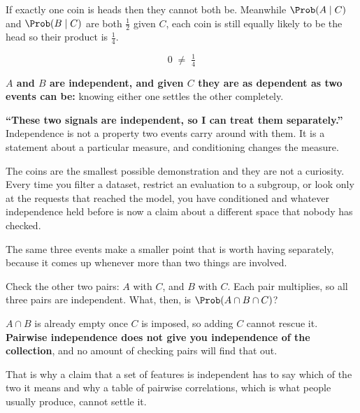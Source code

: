 \begin{fr}

If exactly one coin is heads then they cannot both be. Meanwhile
$\Prob(A \mid C)$ and $\Prob(B \mid C)$ are both $\frac{1}{2}$ \dash{} given
$C$, each coin is still equally likely to be the head \dash{} so their product
is $\frac{1}{4}$.

\[ 0 \;\ne\; \tfrac{1}{4} \]

\textbf{$A$ and $B$ are independent, and given $C$ they are as dependent as two
events can be:} knowing either one settles the other completely.
\end{fr}

\begin{fr}
\begin{trapbox}
\textbf{\enquote{These two signals are independent, so I can treat them
separately.}} Independence is not a property two events carry around with them.
It is a statement about a particular measure, and conditioning changes the
measure.

The coins are the smallest possible demonstration and they are not a curiosity.
Every time you filter a dataset, restrict an evaluation to a subgroup, or look
only at the requests that reached the model, you have conditioned \dash{} and
whatever independence held before is now a claim about a different space that
nobody has checked.
\end{trapbox}
\end{fr}

\begin{fr}
The same three events make a smaller point that is worth having separately,
because it comes up whenever more than two things are involved.

Check the other two pairs: $A$ with $C$, and $B$ with $C$. Each pair
multiplies, so all three pairs are independent. What, then, is
$\Prob(A \cap B \cap C)$?
\dotline
\nextframe
\end{fr}

\begin{fr}

$A \cap B$ is already empty once $C$ is imposed, so adding $C$ cannot rescue
it. \textbf{Pairwise independence does not give you independence of the
collection}, and no amount of checking pairs will find that out.

That is why a claim that a set of features is independent has to say which of
the two it means \dash{} and why a table of pairwise correlations, which is
what people usually produce, cannot settle it.
\end{fr}

